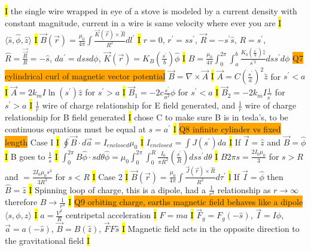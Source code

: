 \documentclass[fontsize=4pt]{scrartcl}
\begin{document}
\hl{I}
the single wire wrapped in eye of a stove is modeled by a current density with constant magnitude, current in a wire is same velocity where ever you are
\hl{I}
$\langle \hat{s}, \hat{\phi}, \hat{z} \rangle$
\hl{I}
$\vec{B}(\vec{r}) = \frac{\mu_0}{4\pi} \int \frac{\vec{K}(\vec{r}) \times \hat{R}}{R^2} dl^{\prime}$
\hl{I}
$r=0$, $r^{\prime} = s s^{\prime}$, $\vec{R} = -s^{\prime} \hat{s}$, $R = s^{\prime}$, $\hat{R} = \frac{\vec{\vec{R}}}{R} = -\hat{s}$, $da^{\prime} = ds s d\phi$, $\vec{K}(\vec{r}) = K_B (\frac{s^{\prime}}{b})\hat{\phi}$
\hl{I}
$B = \frac{\mu_0}{4\pi} 	\int_{0}^{2\pi} \int_{a}^{b}  \frac{K_b(\frac{ s^{\prime}}{b})	\hat{z}} {s^{\prime 2}} ds s^{\prime} d\phi	$
\colorbox{Orange}{Q7 cylindrical curl of magnetic vector potential}
$\vec{B} = \nabla \times \vec{A}$
\hl{I}
$\vec{A} = C(\frac{s^{\prime}}{a})^{2} \hat{z}$ for $s^{\prime} < a$
\hl{I}
$\vec{A} = 2k_m I \ln (s^{\prime}) \hat{z}$ for $s^{\prime} > a$
\hl{I}
$\vec{B}_1 = -2c \frac{s^{\prime}}{a^2} \phi$ for  $s^{\prime} < a$
\hl{I}
$\vec{B}_2 = -2k_m I \frac{1}{s^{\prime}}$ for  $s^{\prime} > a$
\hl{I}
$\frac{1}{r}$ wire of charge relationship for E field generated, and $\frac{1}{r}$ wire of charge relationship for B field generated
\hl{I}
chose C to make sure B is in tesla's, to be continuous equations must be equal at $s=a^{\prime}$
\hl{I}
\colorbox{Orange}{Q8 infinite cylinder vs fixed length}
Case I
\hl{I}
$\oint \vec{B} \cdot d\vec{a} = I_{enclosed} \mu_0$
\hl{I}
$I_{enclosed} = \int J(s^{\prime}) da$
\hl{I} 
If $\vec{I} = \hat{z} $ and $\vec{B} = \hat{\phi}$
\hl{I}
B goes to $\frac{1}{s}$
\hl{I} 
$\int_0^{2\pi} B \hat{\phi} \cdot s d\theta \hat{\phi} = \mu_0 \int_{0}^{2\pi} \int_{0}^{R} \frac{I_0}{\pi R^2}(\frac{s^{\prime}}{R}) ds s^{\prime} d\theta$
\hl{I}
$B 2\pi s = \frac{2I_0 \mu_0}{3}$ for $s>R$ and $=\frac{2I_0 \mu_0 s^3}{3 R^3}$  for $s<R$
\hl{I}
Case 2
\hl{I}
$\vec{B}(\vec{r}) = \frac{\mu_0}{4\pi} \int \frac{\vec{J}(\vec{r}) \times \hat{R}}{R^2} d\tau^{\prime}  $
\hl{l}
If $\vec{I} = \hat{\phi}$ then $\hat{B} = \hat{z}$
\hl{I}
Spinning loop of charge, this is a dipole, had a $\frac{1}{r^3}$ relationship as $r \rightarrow \infty$ therefore $B \rightarrow \frac{1}{r^3}$
\hl{I}
\colorbox{Orange}{Q9 orbiting charge, earths magnetic field behaves like a dipole}
$\langle s, \phi, z \rangle$
\hl{I}
$a = \frac{V^2}{R}$ centripetal acceleration
\hl{I}
$F = ma$
\hl{I}
$\vec{F}_g = F_g (-\hat{s}) $, $\vec{I} = I\hat{\phi}$, $\vec{a} = a (-\hat{s})$, $\vec{B} = B(\hat{z})$, $\vec{F} F\hat{s}$
\hl{I}
Magnetic field acts in the opposite direction to the gravitational field
\hl{I}
\end{document}
